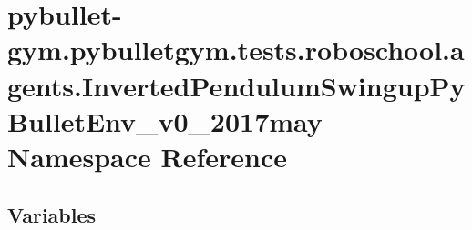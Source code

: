 \hypertarget{namespacepybullet-gym_1_1pybulletgym_1_1tests_1_1roboschool_1_1agents_1_1_inverted_pendulum_swingup_py_bullet_env__v0__2017may}{}\section{pybullet-\/gym.pybulletgym.\+tests.\+roboschool.\+agents.\+Inverted\+Pendulum\+Swingup\+Py\+Bullet\+Env\+\_\+v0\+\_\+2017may Namespace Reference}
\label{namespacepybullet-gym_1_1pybulletgym_1_1tests_1_1roboschool_1_1agents_1_1_inverted_pendulum_swingup_py_bullet_env__v0__2017may}
\subsection*{Variables}
